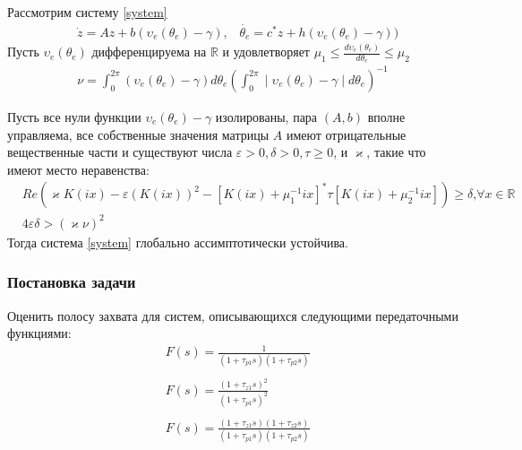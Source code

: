 \documentclass{beamer}
\begin{document}
\begin{frame}
Рассмотрим систему \eqref{system}
 \begin{equation*}
 \begin{aligned}
 &\dot{z} = Az + b(\upsilon_e(\theta_e) - \gamma) \text{,} \quad \dot{\theta_e} = c^*z + h(\upsilon_e(\theta_e) - \gamma))
 \end{aligned}
\end{equation*}
Пусть $\upsilon_e(\theta_e)$ дифференцируема на $\mathbb {R}$ и удовлетворяет $\mu_1 \leq \frac{d\upsilon_e(\theta_e)}{d\theta_e} \leq \mu_2$
 \begin{equation}
 \begin{aligned}
\nu = \int_{0}^{2\pi} (\upsilon_e(\theta_e) - \gamma) d\theta_e \left(\int_{0}^{2\pi} \mid \upsilon_e(\theta_e) - \gamma \mid d\theta_e\right)^{-1}
 \end{aligned}
\end{equation}
\begin{theorem}
Пусть все нули функции $\upsilon_e(\theta_e) - \gamma$ изолированы, пара $(A, b)$ вполне управляема, все собственные значения матрицы $A$ имеют отрицательные вещественные части и существуют числа $\varepsilon > 0, \delta > 0, \tau \geq 0$, и $\varkappa$, такие что имеют место неравенства:
 \begin{align}
&Re(\varkappa K(ix)- \varepsilon(K(ix))^2-[K(ix)+\mu_1^{-1}ix]^*\tau[K(ix)+\mu_2^{-1}ix])\geq\delta\text{,}\forall x \in \mathbb{R}\label{first_th_eq}\\
&4\varepsilon\delta > (\varkappa\nu)^2
\end{align}
Тогда система \eqref{system} глобально ассимптотически устойчива.
\end{theorem}
\end{frame}

\begin{frame}
\frametitle{Постановка задачи}
Оценить полосу захвата для систем, описывающихся следующими передаточными функциями:
 \begin{equation*}
 \begin{aligned}
&F(s) = \frac{1}{(1+\tau_{p1}s)(1+\tau_{p2}s)}\\
&\\
&F(s) = \frac{(1+\tau_{z1}s)^2}{(1+\tau_{p1}s)^2}\\
&\\
&F(s) = \frac{(1+\tau_{z1}s)(1+\tau_{z2}s)}{(1+\tau_{p1}s)(1+\tau_{p2}s)}
 \end{aligned}
\end{equation*}
\end{frame}
\end{document}
